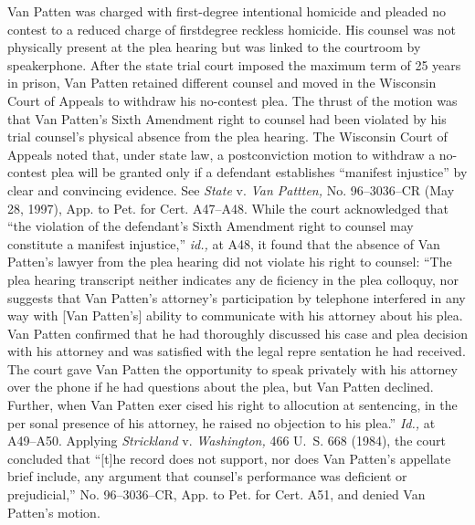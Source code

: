   Van Patten was charged with first-degree intentional homicide and pleaded no contest to a reduced charge of firstdegree reckless homicide. His counsel was not physically present at the plea hearing but was linked to the courtroom by speakerphone. After the state trial court imposed the maximum term of 25 years in prison, Van Patten retained different counsel and moved in the Wisconsin Court of Appeals to withdraw his no-contest plea. The thrust of the motion was that Van Patten's Sixth Amendment right to counsel had been violated by his trial counsel's physical absence from the plea hearing. The Wisconsin Court of Appeals noted that, under state law, a postconviction motion to withdraw a no-contest plea will be granted only if a defendant establishes ``manifest injustice'' by clear and convincing evidence. See \emph{State} v. \emph{Van Pattten,} No. 96--3036--CR (May 28, 1997), App. to Pet. for Cert. A47--A48. While the court acknowledged that ``the violation of the defendant's Sixth Amendment right to counsel may constitute a manifest injustice,'' \emph{id.,} at A48, it found that the absence of Van Patten's lawyer from the plea hearing did not violate his right to counsel: ``The plea hearing transcript neither indicates any de ficiency in the plea colloquy, nor suggests that Van Pat\newpage ten's attorney's participation by telephone interfered in any way with [Van Patten's] ability to communicate with his attorney about his plea. Van Patten confirmed that he had thoroughly discussed his case and plea decision with his attorney and was satisfied with the legal repre sentation he had received. The court gave Van Patten the opportunity to speak privately with his attorney over the phone if he had questions about the plea, but Van Patten declined. Further, when Van Patten exer cised his right to allocution at sentencing, in the per sonal presence of his attorney, he raised no objection to his plea.'' \emph{Id.,} at A49--A50. Applying \emph{Strickland} v. \emph{Washington,} 466 U.~S. 668 (1984), the court concluded that ``[t]he record does not support, nor does Van Patten's appellate brief include, any argument that counsel's performance was deficient or prejudicial,'' No. 96--3036--CR, App. to Pet. for Cert. A51, and denied Van Patten's motion.

